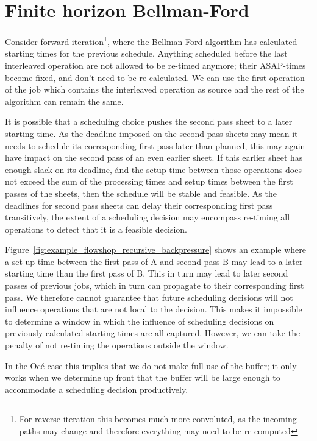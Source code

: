\documentclass[]{article}
\begin{document}
\section{Finite horizon Bellman-Ford}

Consider forward iteration\footnote{For reverse iteration this becomes much more convoluted, as the incoming paths may change and therefore everything may need to be re-computed}, where the Bellman-Ford algorithm has calculated starting times for the previous schedule. Anything scheduled before the last interleaved operation are not allowed to be re-timed anymore; their ASAP-times become fixed, and don't need to be re-calculated. We can use the first operation of the job which contains the interleaved operation as source and the rest of the algorithm can remain the same.

It is possible that a scheduling choice pushes the second pass sheet to a later starting time. As the deadline imposed on the second pass sheets may mean it needs to schedule its corresponding first pass later than planned, this may again have impact on the second pass of an even earlier sheet. If this earlier sheet has enough slack on its deadline, \'and the setup time between those operations does not exceed the sum of the processing times and setup times between the first passes of the sheets, then the schedule will be stable and feasible. As the deadlines for second pass sheets can delay their corresponding first pass transitively, the extent of a scheduling decision may encompass re-timing all operations to detect that it is a feasible decision.

Figure~\ref{fig:example_flowshop_recursive_backpressure} shows an example where a set-up time between the first pass of A and second pass B may lead to a later starting time than the first pass of B. This in turn may lead to later second passes of previous jobs, which in turn can propagate to their corresponding first pass. We therefore cannot guarantee that future scheduling decisions will not influence operations that are not local to the decision. This makes it impossible to determine a window in which the influence of scheduling decisions on previously calculated starting times are all captured. However, we can take the penalty of not re-timing the operations outside the window.

In the Oc\'e case this implies that we do not make full use of the buffer; it only works when we determine up front that the buffer will be large enough to accommodate a scheduling decision productively.
\end{document}
